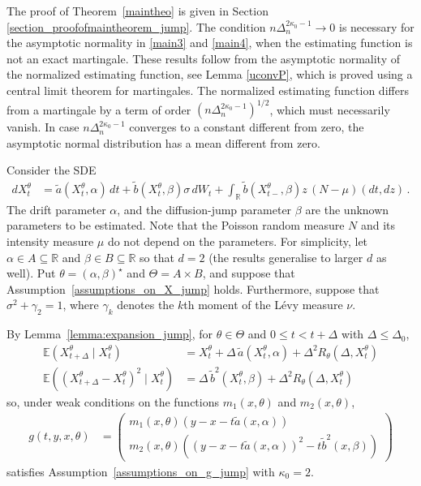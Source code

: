 \documentclass[11pt,a4paper]{article}
\newcommand{\EE}{{\mathbb E}}
\newcommand{\RR}{{\mathbb R}}
\numberwithin{equation}{section}
\numberwithin{theorem}{section}
\begin{document}
%
The proof of Theorem~\ref{maintheo} is given in Section \ref{section_proofofmaintheorem_jump}. 
The condition $n\Delta_n^{2{\kappa_0}-1} \to 0$ is necessary for the asymptotic normality in \ref{main3} and \ref{main4}, when the estimating function is not an exact martingale. These results follow from the asymptotic normality of the normalized estimating function, see Lemma \ref{uconvP}, which is proved using a central limit theorem for martingales. The normalized estimating function differs from a martingale by a term of order $(n\Delta_n^{2\kappa_0-1})^{1/2}$, which must necessarily vanish. In case $n\Delta_n^{2\kappa_0-1}$ converges to a constant different from zero, the asymptotic normal distribution has a mean different from zero.\medskip
%
\begin{example}
Consider the SDE
\begin{align*}
dX^\theta_t &= \tilde{a}(X^\theta_t, \alpha)\, dt + \tilde{b}(X^\theta_t, \beta)\sigma\, dW_t + \int_\RR \tilde{b}(X^\theta_{t-}, \beta)z\, (N-\mu)(dt,dz)\,.
\end{align*}
The drift parameter $\alpha$, and the diffusion-jump parameter $\beta$ are the unknown parameters to be estimated. Note that the Poisson random measure $N$ and its intensity measure $\mu$ do not depend on the parameters. For simplicity, let $\alpha \in A \subseteq \RR$ and $\beta \in B \subseteq \RR$ so that $d=2$ (the results generalise to larger $d$ as well). Put $\theta = (\alpha,\beta)^\star $ and $\Theta = A \times B$, and suppose that Assumption~\ref{assumptions_on_X_jump} holds. Furthermore, suppose that $\sigma^2 + \gamma_2 = 1$, where $\gamma_k$ denotes the $k$th moment of the L\'{e}vy measure $\nu$. \medskip

By Lemma~\ref{lemma:expansion_jump}, for $\theta \in \Theta$ and $0\leq t< t+\Delta$ with $\Delta \leq \Delta_0$,
\begin{align*}
\EE(X^\theta_{t+\Delta}\mid X^\theta_t) &= X^\theta_t + \Delta\,\tilde{a}(X^\theta_t, \alpha) +\Delta^2 R_\theta(\Delta, X^\theta_t)\\
\EE( (X^\theta_{t+\Delta}-X^\theta_t)^2\mid X^\theta_t) &= \Delta\,\tilde{b}^2(X^\theta_t,\beta) + \Delta^2 R_\theta(\Delta,X^\theta_t)
\end{align*}
so, under weak conditions on the functions $m_1(x, \theta)$ and $m_2(x,\theta)$, 
\begin{align*}
g(t,y,x, \theta) &= \begin{pmatrix} \displaystyle m_1(x,\theta)\left(y-x-t\tilde{a}(x, \alpha)\right) \\ \displaystyle m_2(x, \theta)\left(\left(y-x-t\tilde{a}(x, \alpha)\right)^2 - t\tilde{b}^2(x, \beta)\right)
\end{pmatrix}
\end{align*}
satisfies Assumption~\ref{assumptions_on_g_jump} with ${\kappa_0} = 2$. \medskip


\end{example}
\end{document}
